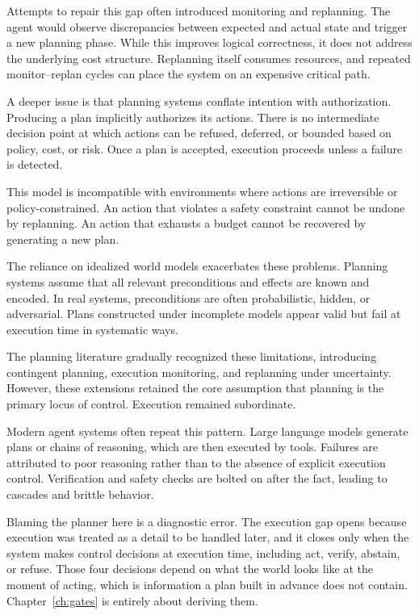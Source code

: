 Attempts to repair this gap often introduced monitoring and replanning. The agent
would observe discrepancies between expected and actual state and trigger a new
planning phase. While this improves logical correctness, it does not address the
underlying cost structure. Replanning itself consumes resources, and repeated
monitor–replan cycles can place the system on an expensive critical path.

A deeper issue is that planning systems conflate intention with authorization.
Producing a plan implicitly authorizes its actions. There is no intermediate
decision point at which actions can be refused, deferred, or bounded based on
policy, cost, or risk. Once a plan is accepted, execution proceeds unless a failure
is detected.

This model is incompatible with environments where actions are irreversible or
policy-constrained. An action that violates a safety constraint cannot be undone
by replanning. An action that exhausts a budget cannot be recovered by generating a
new plan.

The reliance on idealized world models exacerbates these problems. Planning systems
assume that all relevant preconditions and effects are known and encoded. In real
systems, preconditions are often probabilistic, hidden, or adversarial. Plans
constructed under incomplete models appear valid but fail at execution time in
systematic ways.

The planning literature gradually recognized these limitations, introducing
contingent planning, execution monitoring, and replanning under uncertainty.
However, these extensions retained the core assumption that planning is the
primary locus of control. Execution remained subordinate.

Modern agent systems often repeat this pattern. Large language models generate
plans or chains of reasoning, which are then executed by tools. Failures are
attributed to poor reasoning rather than to the absence of explicit execution
control. Verification and safety checks are bolted on after the fact, leading to
cascades and brittle behavior.

Blaming the planner here is a diagnostic error. The execution gap opens because
execution was treated as a detail to be handled later, and it closes only when the
system makes control decisions at execution time, including act, verify, abstain, or refuse.
Those four decisions depend on what the world looks like at the moment of acting,
which is information a plan built in advance does not contain. Chapter~\ref{ch:gates}
is entirely about deriving them.

